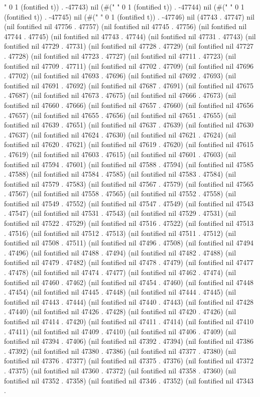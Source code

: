 " 0 1 (fontified t)) . -47743) nil (#(" " 0 1 (fontified t)) . -47744) nil (#(" " 0 1 (fontified t)) . -47745) nil (#(" " 0 1 (fontified t)) . -47746) nil (47743 . 47747) nil (nil fontified nil 47756 . 47757) (nil fontified nil 47745 . 47756) (nil fontified nil 47744 . 47745) (nil fontified nil 47743 . 47744) (nil fontified nil 47731 . 47743) (nil fontified nil 47729 . 47731) (nil fontified nil 47728 . 47729) (nil fontified nil 47727 . 47728) (nil fontified nil 47723 . 47727) (nil fontified nil 47711 . 47723) (nil fontified nil 47709 . 47711) (nil fontified nil 47702 . 47709) (nil fontified nil 47696 . 47702) (nil fontified nil 47693 . 47696) (nil fontified nil 47692 . 47693) (nil fontified nil 47691 . 47692) (nil fontified nil 47687 . 47691) (nil fontified nil 47675 . 47687) (nil fontified nil 47673 . 47675) (nil fontified nil 47666 . 47673) (nil fontified nil 47660 . 47666) (nil fontified nil 47657 . 47660) (nil fontified nil 47656 . 47657) (nil fontified nil 47655 . 47656) (nil fontified nil 47651 . 47655) (nil fontified nil 47639 . 47651) (nil fontified nil 47637 . 47639) (nil fontified nil 47630 . 47637) (nil fontified nil 47624 . 47630) (nil fontified nil 47621 . 47624) (nil fontified nil 47620 . 47621) (nil fontified nil 47619 . 47620) (nil fontified nil 47615 . 47619) (nil fontified nil 47603 . 47615) (nil fontified nil 47601 . 47603) (nil fontified nil 47594 . 47601) (nil fontified nil 47588 . 47594) (nil fontified nil 47585 . 47588) (nil fontified nil 47584 . 47585) (nil fontified nil 47583 . 47584) (nil fontified nil 47579 . 47583) (nil fontified nil 47567 . 47579) (nil fontified nil 47565 . 47567) (nil fontified nil 47558 . 47565) (nil fontified nil 47552 . 47558) (nil fontified nil 47549 . 47552) (nil fontified nil 47547 . 47549) (nil fontified nil 47543 . 47547) (nil fontified nil 47531 . 47543) (nil fontified nil 47529 . 47531) (nil fontified nil 47522 . 47529) (nil fontified nil 47516 . 47522) (nil fontified nil 47513 . 47516) (nil fontified nil 47512 . 47513) (nil fontified nil 47511 . 47512) (nil fontified nil 47508 . 47511) (nil fontified nil 47496 . 47508) (nil fontified nil 47494 . 47496) (nil fontified nil 47488 . 47494) (nil fontified nil 47482 . 47488) (nil fontified nil 47479 . 47482) (nil fontified nil 47478 . 47479) (nil fontified nil 47477 . 47478) (nil fontified nil 47474 . 47477) (nil fontified nil 47462 . 47474) (nil fontified nil 47460 . 47462) (nil fontified nil 47454 . 47460) (nil fontified nil 47448 . 47454) (nil fontified nil 47445 . 47448) (nil fontified nil 47444 . 47445) (nil fontified nil 47443 . 47444) (nil fontified nil 47440 . 47443) (nil fontified nil 47428 . 47440) (nil fontified nil 47426 . 47428) (nil fontified nil 47420 . 47426) (nil fontified nil 47414 . 47420) (nil fontified nil 47411 . 47414) (nil fontified nil 47410 . 47411) (nil fontified nil 47409 . 47410) (nil fontified nil 47406 . 47409) (nil fontified nil 47394 . 47406) (nil fontified nil 47392 . 47394) (nil fontified nil 47386 . 47392) (nil fontified nil 47380 . 47386) (nil fontified nil 47377 . 47380) (nil fontified nil 47376 . 47377) (nil fontified nil 47375 . 47376) (nil fontified nil 47372 . 47375) (nil fontified nil 47360 . 47372) (nil fontified nil 47358 . 47360) (nil fontified nil 47352 . 47358) (nil fontified nil 47346 . 47352) (nil fontified nil 47343 . 